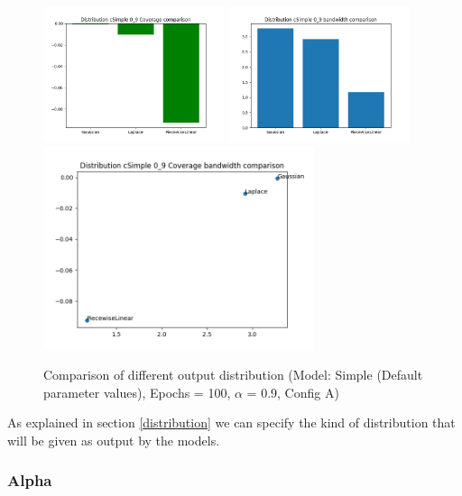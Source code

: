 \documentclass[a4paper, 12pt]{article}
\begin{document}
\begin{figure}[!h]
    \centering
    \includegraphics[width=200px]{plots/hist/a/distribution/cSimple/0_9/Coverage.png}
    \includegraphics[width=200px]{plots/hist/a/distribution/cSimple/0_9/bandwidth.png}
    \includegraphics[width=300px]{plots/scatter/a/distribution/cSimple/0_9/Coverage_bandwidth.png}
    \caption{Comparison of different output distribution (Model: Simple (Default parameter values), Epochs = 100, $\alpha$ = 0.9,  Config A)}
    \label{fig:comp_outdistrib}
\end{figure}

As explained in section \ref{distribution} we can specify the kind of distribution that will be given as output by the models. 

\subsubsection{Alpha} \label{comp_alpha}
\end{document}
